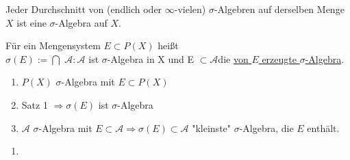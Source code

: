 \documentclass[11pt]{memoir}
\begin{document}
\begin{Satz}
Jeder Durchschnitt von (endlich oder $\infty$-vielen) $\sigma$-Algebren auf derselben Menge $X$ ist eine $\sigma$-Algebra auf $X$.
\end{Satz}

\begin{Definition}
Für ein Mengensystem $E \subset P(X)$ heißt \\
$\sigma(E):=\bigcap$ \textbraceleft $\mathscr{A}: \mathscr{A}$ ist $\sigma$-Algebra in X und E $ \subset \mathscr{A}$\textbraceright die \underline{ von $E$ erzeugte $\sigma$-Algebra}.
\end{Definition}

\begin{Bemerkung}
\begin{enumerate}
	\item $P(X)$ $\sigma$-Algebra mit $E \subset P(X)$
	\item Satz 1 $\Rightarrow \sigma(E)$ ist $\sigma$-Algebra
	\item $\mathscr{A}$ $\sigma$-Algebra mit $E \subset \mathscr{A} \Rightarrow \sigma(E) \subset 		\mathscr{A}$ "kleinste"{} $\sigma$-Algebra, die $E$ enthält.
\end{enumerate}
\end{Bemerkung}

\begin{Beispiel}
\begin{enumerate}
	\item
\end{enumerate}
\end{Beispiel}
\end{document}
